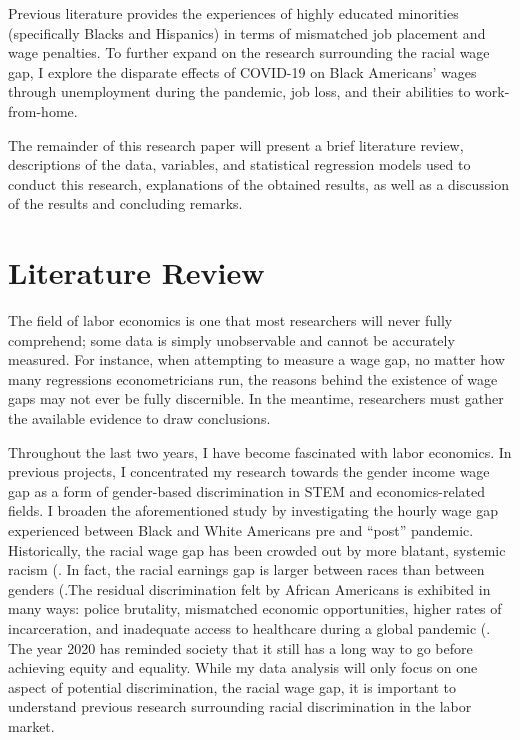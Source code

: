 \documentclass[12pt, english]{article}
\begin{document}
Previous literature provides the experiences of highly educated minorities (specifically Blacks and Hispanics) in terms of mismatched job placement and wage penalties. To further expand on the research surrounding the racial wage gap, I explore the disparate effects of COVID-19 on Black Americans’ wages through unemployment during the pandemic, job loss, and their abilities to work-from-home.

The remainder of this research paper will present a brief literature review, descriptions of the data, variables, and statistical regression models used to conduct this research, explanations of the obtained results, as well as a discussion of the results and concluding remarks.

\section{Literature Review}

The field of labor economics is one that most researchers will never fully comprehend; some data is simply unobservable and cannot be accurately measured. For instance, when attempting to measure a wage gap, no matter how many regressions econometricians run, the reasons behind the existence of wage gaps may not ever be fully discernible. In the meantime, researchers must gather the available evidence to draw conclusions. 

Throughout the last two years, I have become fascinated with labor economics. In previous projects, I concentrated my research towards the gender income wage gap as a form of gender-based discrimination in STEM and economics-related fields. I broaden the aforementioned study by investigating the hourly wage gap experienced between Black and White Americans pre and “post” pandemic. Historically, the racial wage gap has been crowded out by more blatant, systemic racism (\citet{Koechlin2019}. In fact, the racial earnings gap is larger between races than between genders (\citet{McCall2001}.The residual discrimination felt by African Americans is exhibited in many ways: police brutality, mismatched economic opportunities, higher rates of incarceration, and inadequate access to healthcare during a global pandemic (\citet{CLAY2021}. The year 2020 has reminded society that it still has a long way to go before achieving equity and equality. While my data analysis will only focus on one aspect of potential discrimination, the racial wage gap, it is important to understand previous research surrounding racial discrimination in the labor market. 
\end{document}

